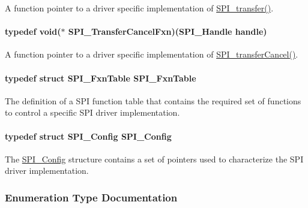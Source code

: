 A function pointer to a driver specific implementation of \hyperlink{_s_p_i_8h_a989e17f96b54fcc3dc2cac5f8ac6bdb2}{S\-P\-I\-\_\-transfer()}. 

\paragraph[{S\-P\-I\-\_\-\-Transfer\-Cancel\-Fxn}]{\setlength{\rightskip}{0pt plus 5cm}typedef void($\ast$ S\-P\-I\-\_\-\-Transfer\-Cancel\-Fxn)({\bf S\-P\-I\-\_\-\-Handle} handle)}\label{_s_p_i_8h_a7e33c3913abdf78efc0ca606850a421b}


A function pointer to a driver specific implementation of \hyperlink{_s_p_i_8h_a6819f7761fc3505c4f885653ff8121f0}{S\-P\-I\-\_\-transfer\-Cancel()}. 

\paragraph[{S\-P\-I\-\_\-\-Fxn\-Table}]{\setlength{\rightskip}{0pt plus 5cm}typedef struct {\bf S\-P\-I\-\_\-\-Fxn\-Table}  {\bf S\-P\-I\-\_\-\-Fxn\-Table}}\label{_s_p_i_8h_abfe91bed666eb36f3b3fa54f4b9f84bf}


The definition of a S\-P\-I function table that contains the required set of functions to control a specific S\-P\-I driver implementation. 

\paragraph[{S\-P\-I\-\_\-\-Config}]{\setlength{\rightskip}{0pt plus 5cm}typedef struct {\bf S\-P\-I\-\_\-\-Config}  {\bf S\-P\-I\-\_\-\-Config}}\label{_s_p_i_8h_ae19802ec6efc91414e46af9b2435b942}


The \hyperlink{struct_s_p_i___config}{S\-P\-I\-\_\-\-Config} structure contains a set of pointers used to characterize the S\-P\-I driver implementation. 



\subsubsection{Enumeration Type Documentation}
